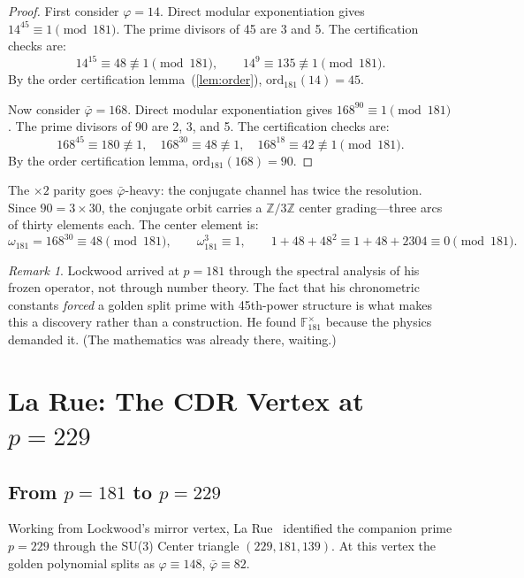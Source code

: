 \documentclass[12pt,oneside]{article}
\theoremstyle{principia}
\theoremstyle{definition}
\theoremstyle{remark}
\newtheorem{remark}[theorem]{Remark}
\providecommand{\ZZ}{\mathbb{Z}}
\providecommand{\FF}{\mathbb{F}}
\providecommand{\vp}{\varphi}
\providecommand{\vpbar}{\bar{\varphi}}
\begin{document}
\begin{proof}
First consider $\vp = 14$. Direct modular exponentiation gives $14^{45} \equiv 1 \pmod{181}$. The prime divisors of 45 are 3 and 5. The certification checks are:
\[
14^{15} \equiv 48 \not\equiv 1 \pmod{181}, \qquad 14^{9} \equiv 135 \not\equiv 1 \pmod{181}.
\]
By the order certification lemma~(\ref{lem:order}), $\mathrm{ord}_{181}(14) = 45$.

Now consider $\vpbar = 168$. Direct modular exponentiation gives $168^{90} \equiv 1 \pmod{181}$. The prime divisors of 90 are 2, 3, and 5. The certification checks are:
\[
168^{45} \equiv 180 \not\equiv 1, \quad 168^{30} \equiv 48 \not\equiv 1, \quad 168^{18} \equiv 42 \not\equiv 1 \pmod{181}.
\]
By the order certification lemma, $\mathrm{ord}_{181}(168) = 90$. \qedhere
\end{proof}

The $\times 2$ parity goes $\vpbar$-heavy: the conjugate channel has twice the resolution. Since $90 = 3 \times 30$, the conjugate orbit carries a $\ZZ/3\ZZ$ center grading---three arcs of thirty elements each. The center element is:
\[
\omega_{181} = 168^{30} \equiv 48 \pmod{181}, \qquad \omega_{181}^3 \equiv 1, \qquad 1 + 48 + 48^2 \equiv 1 + 48 + 2304 \equiv 0 \pmod{181}.
\]

\begin{remark}
Lockwood arrived at $p = 181$ through the spectral analysis of his frozen operator, not through number theory. The fact that his chronometric constants \emph{forced} a golden split prime with 45th-power structure is what makes this a discovery rather than a construction. He found $\FF_{181}^\times$ because the physics demanded it. (The mathematics was already there, waiting.)
\end{remark}


\section{La Rue: The CDR Vertex at $p = 229$}

\subsection{From $p = 181$ to $p = 229$}

Working from Lockwood's mirror vertex, La Rue~\cite{larue_chromatic,larue_lc} identified the companion prime $p = 229$ through the SU(3) Center triangle $(229, 181, 139)$. At this vertex the golden polynomial splits as $\vp \equiv 148$, $\vpbar \equiv 82$.
\end{document}

